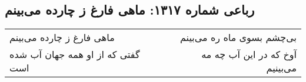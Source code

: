 \begin{center}
\section*{رباعی شماره ۱۳۱۷: ماهی فارغ ز چارده می‌بینم}
\label{sec:1317}
\begin{longtable}{l p{0.5cm} r}
ماهی فارغ ز چارده می‌بینم
&&
بی‌چشم بسوی ماه ره می‌بینم
\\
گفتی که از او همه جهان آب شده است
&&
آوخ که در این آب چه مه می‌بینیم
\\
\end{longtable}
\end{center}
